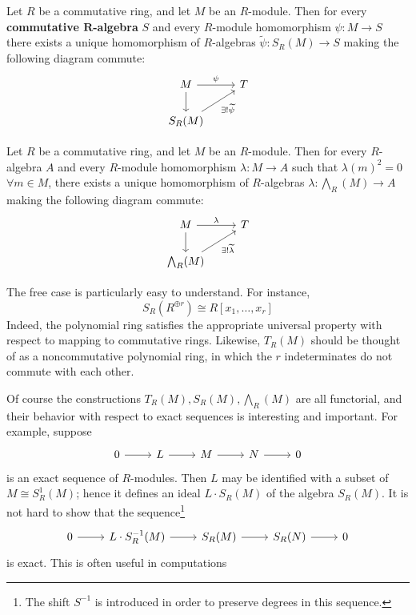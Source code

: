 \begin{proposition}
Let $R$ be a commutative ring, and let $M$ be an $R$-module. Then for every \textbf{commutative $\bm{R}$-algebra} $S$ and every $R$-module homomorphism $\psi:M\to S$ there exists a unique homomorphism of $R$-algebras $\widetilde{\psi}:S_R(M)\to S$ making the following diagram commute:
\[\begin{tikzcd}
M\ar[d]\ar[r,"\psi"]&T\\
S_R(M)\ar[ru,swap,"\exists !\widetilde{\psi}"]
\end{tikzcd}\]
\end{proposition}
\begin{proposition}
Let $R$ be a commutative ring, and let $M$ be an $R$-module. Then for every $R$-algebra $A$ and every $R$-module homomorphism $\lambda:M\to A$ such that $\lambda(m)^2=0$ $\forall m\in M$, there exists a unique homomorphism of $R$-algebras $\lambda:\bigwedge_R(M)\to A$ making the following diagram commute:
\[\begin{tikzcd}
M\ar[d]\ar[r,"\lambda"]&T\\
\bigwedge_R(M)\ar[ru,swap,"\exists !\widetilde{\lambda}"]
\end{tikzcd}\]
\end{proposition}
\begin{example}
The free case is particularly easy to understand. For instance,
\[S_R(R^{\oplus r})\cong R[x_1,\dots,x_r]\]
Indeed, the polynomial ring satisfies the appropriate universal property with respect to mapping to commutative rings. Likewise, $T_R(M)$ should be thought of as a noncommutative polynomial ring, in which the $r$ indeterminates do not commute with each other.
\end{example}
Of course the constructions $T_R(M),S_R(M),\bigwedge_R(M)$ are all functorial, and their behavior with respect to exact sequences is interesting and important. For example, suppose
\[\begin{tikzcd}
0\ar[r]&L\ar[r]&M\ar[r]&N\ar[r]&0
\end{tikzcd}\]
is an exact sequence of $R$-modules. Then $L$ may be identified with a subset of $M\cong S^1_R(M)$; hence it defines an ideal $L\cdot S_R(M)$ of the algebra $S_R(M)$. It is not hard to show that the sequence\footnote{The shift $S^{-1}$ is introduced in order to preserve degrees in this sequence.}
\[\begin{tikzcd}
0\ar[r]&L\cdot S^{-1}_R(M)\ar[r]&S_R(M)\ar[r]&S_R(N)\ar[r]&0
\end{tikzcd}\]
is exact. This is often useful in computations
